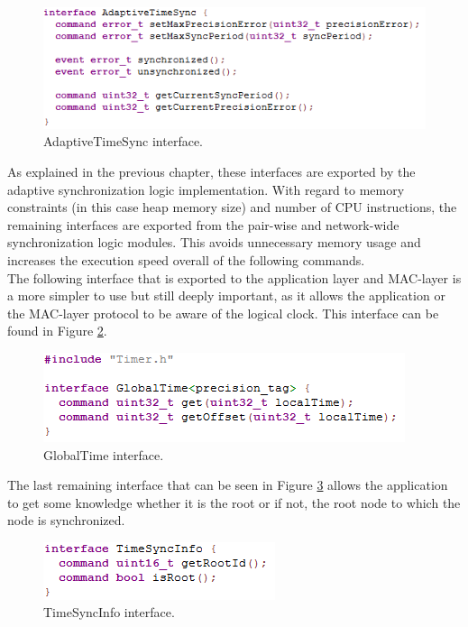 \begin{figure}[!htb]
\begin{center}
\includegraphics[scale=0.5]{./images/27-ttsp-code_interfaces.png}
\end{center}
\caption{AdaptiveTimeSync interface.}
\label{adapttimeysnc}
\end{figure}

As explained in the previous chapter, these interfaces are exported by the adaptive synchronization logic implementation. With regard to memory constraints (in this case heap memory size) and number of CPU instructions, the remaining interfaces are exported from the pair-wise and network-wide synchronization logic modules. This avoids unnecessary memory usage and increases the execution speed overall of the following commands.\\
The following interface that is exported to the application layer and MAC-layer is a more simpler to use but still deeply important, as it allows the application or the MAC-layer protocol to be aware of the logical clock. This interface can be found in Figure \ref{globaltime}.

\begin{figure}[!htb]
\begin{center}
\includegraphics[scale=0.5]{./images/28-ttsp-code_interfaces2.png}
\end{center}
\caption{GlobalTime interface.}
\label{globaltime}
\end{figure}

The last remaining interface that can be seen in Figure \ref{timesyncinfo} allows the application to get some knowledge whether it is the root or if not, the root node to which the node is synchronized.

\begin{figure}[!htb]
\begin{center}
\includegraphics[scale=0.5]{./images/29-ttsp-code_interfaces3.png}
\end{center}
\caption{TimeSyncInfo interface.}
\label{timesyncinfo}
\end{figure}

